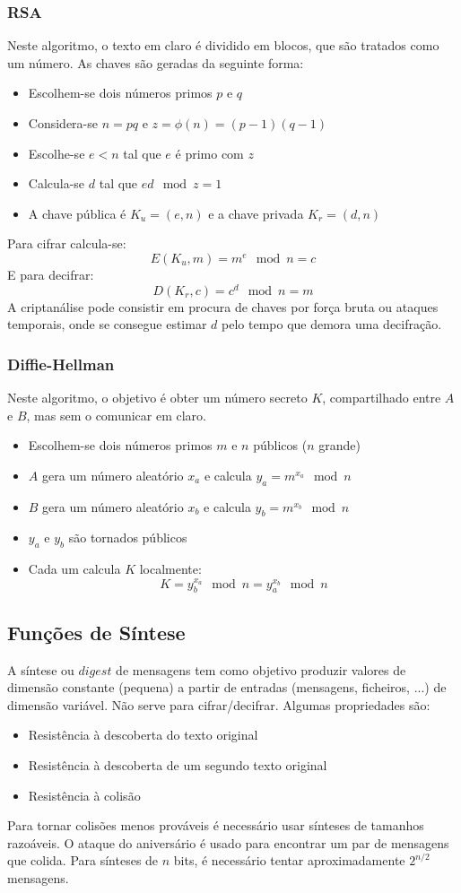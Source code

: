 \documentclass[10pt,a4paper]{report}
\begin{document}
\subsubsection{RSA}
Neste algoritmo, o texto em claro é dividido em blocos, que são tratados como um número. As chaves são geradas da seguinte forma:
\begin{itemize}
\item Escolhem-se dois números primos $p$ e $q$
\item Considera-se $n = pq$ e $z = \phi(n) = (p-1)(q-1)$
\item Escolhe-se $e < n$ tal que $e$ é primo com $z$
\item Calcula-se $d$ tal que $ed \mod z = 1$
\item A chave pública é $K_u = (e,n)$ e a chave privada $K_r = (d,n)$
\end{itemize}
Para cifrar calcula-se:
$$
E(K_u,m) = m^e \mod n = c
$$
E para decifrar:
$$
D(K_r,c) = c^d \mod n = m
$$
A criptanálise pode consistir em procura de chaves por força bruta ou ataques temporais, onde se consegue estimar $d$ pelo tempo que demora uma decifração.
\subsubsection{Diffie-Hellman}
Neste algoritmo, o objetivo é obter um número secreto $K$, compartilhado entre $A$ e $B$, mas sem o comunicar em claro.
\begin{itemize}
\item Escolhem-se dois números primos $m$ e $n$ públicos ($n$ grande)
\item $A$ gera um número aleatório $x_a$ e calcula $y_a = m^{x_a} \mod n$
\item $B$ gera um número aleatório $x_b$ e calcula $y_b = m^{x_b} \mod n$
\item $y_a$ e $y_b$ são tornados públicos
\item Cada um calcula $K$ localmente:
$$
K = y_b^{x_a} \mod n = y_a^{x_b} \mod n
$$
\end{itemize}
\subsection{Funções de Síntese}
A síntese ou $digest$ de mensagens tem como objetivo produzir valores de dimensão constante (pequena) a partir de entradas (mensagens, ficheiros, ...) de dimensão variável. Não serve para cifrar/decifrar. Algumas propriedades são:
\begin{itemize}
\item Resistência à descoberta do texto original
\item Resistência à descoberta de um segundo texto original
\item Resistência à colisão
\end{itemize}
Para tornar colisões menos prováveis é necessário usar sínteses de tamanhos razoáveis. O ataque do aniversário é usado para encontrar um par de mensagens que colida. Para sínteses de $n$ bits, é necessário tentar aproximadamente $2^{n/2}$ mensagens.
\end{document}
